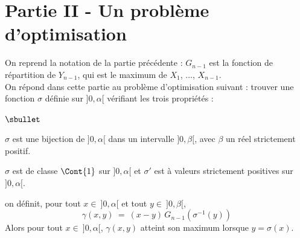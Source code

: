 \documentclass[11pt]{article}%
\begin{document}
\section*{Partie II - Un problème d'optimisation}

\noindent
On reprend la notation de la partie précédente : $G_{n-1}$ est la
fonction de répartition de $Y_{n-1}$, qui est le maximum de $X_1$, 
$\ldots$, $X_{n-1}$.\\
On répond dans cette partie au problème d'optimisation suivant : 
trouver une fonction $\sigma$ définie sur $]0,\alpha[$ vérifiant les 
trois propriétés :
\begin{noliste}{$\sbullet$}
  \item $\sigma$ est une bijection de $]0,\alpha[$ dans un intervalle 
  $]0,\beta[$, avec $\beta$ un réel strictement positif.
  \item $\sigma$ est de classe $\Cont{1}$ sur $]0,\alpha[$ et 
  $\sigma'$ est à valeurs strictement positives sur $]0,\alpha[$.
  \item on définit, pour tout $x \in \ ]0,\alpha[$ et tout $y \in 
  \ ]0, \beta[$,
  \[
    \gamma(x,y) \ = \ (x-y) \, G_{n-1}(\sigma^{-1}(y))
  \]
  Alors pour tout $x \in \ ]0,\alpha[$, $\gamma(x,y)$ atteint son 
  maximum lorsque $y = \sigma(x)$.
\end{noliste}
\end{document}

